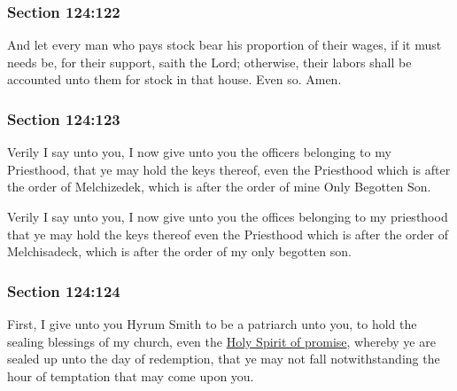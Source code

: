 	\subsubsection{Section 124:122} %
		\label{DC124-122}

		And let every man who pays stock bear his proportion of their wages, if it must needs be, for their support, saith the Lord; otherwise, their labors shall be accounted unto them for stock in that house.  Even so.  Amen.


	\subsubsection{Section 124:123} %
		\label{DC124-123}

		Verily I say unto you, I now give unto you the officers belonging to my Priesthood, that ye may hold the keys thereof, even the Priesthood which is after the order of Melchizedek, which is after the order of mine Only Begotten Son.

		\begin{framed}
		\scriptsize
			\begin{compactdesc}
				\item[JSP] Verily I say unto you, I now give unto you the offices belonging to my priesthood that ye may hold the keys thereof even the Priesthood which is after the order of Melchisadeck, which is after the order of my only begotten son.
			\end{compactdesc}
		\end{framed}

	\subsubsection{Section 124:124} %
		\label{DC124-124}

		First, I give unto you Hyrum Smith to be a patriarch unto you, to hold the sealing blessings of my church, even the \hyperref[HSOP]{Holy Spirit of promise}, whereby ye are sealed up unto the day of redemption, that ye may not fall notwithstanding the hour of temptation that may come upon you.

